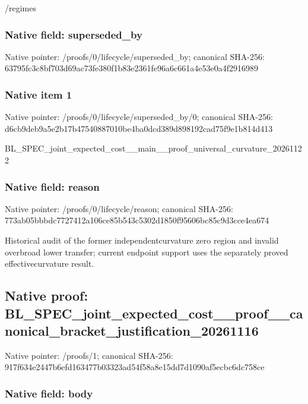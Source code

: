 \documentclass[10pt,a4paper]{article}
\begin{document}
/regimes


\subsubsection{Native field: superseded\_by}


Native pointer: /proofs/0/lifecycle/superseded\_by; canonical SHA-256: 63795fc3c8bf703d69ac73fe\allowbreak{}380f1b83e2361fe96a6c661a\allowbreak{}4e53e0a4f2916989



\subsubsection{Native item 1}


Native pointer: /proofs/0/lifecycle/superseded\_by/0; canonical SHA-256: d6cb9deb9a5e2b17b4754088\allowbreak{}7010be4ba0dcd389d898192c\allowbreak{}ad75f9e1b814d413


BL\_SPEC\_joint\_expected\_c\allowbreak{}ost\_\_main\_\_proof\_univers\allowbreak{}al\_curvature\_20261122


\subsubsection{Native field: reason}


Native pointer: /proofs/0/lifecycle/reason; canonical SHA-256: 773ab05bbbdc7727412a106c\allowbreak{}e85b543c5302d1850f95606b\allowbreak{}c85c9d3cce4ea674


Historical audit of the former independentcurvature zero region and invalid overbroad lower transfer; current endpoint support uses the separately proved effectivecurvature result.


\subsection{Native proof: BL\_SPEC\_joint\_expected\_c\allowbreak{}ost\_\_proof\_\_canonical\_br\allowbreak{}acket\_justification\_2026\allowbreak{}1116}


Native pointer: /proofs/1; canonical SHA-256: 917f634e2447b6efd163477b\allowbreak{}03323ad54f58a8e15dd7d109\allowbreak{}0af5ecbc6dc758ce



\subsubsection{Native field: body}
\end{document}
